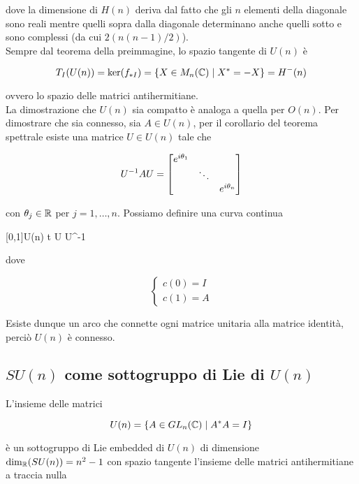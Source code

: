 dove la dimensione di $ H(n) $ deriva dal fatto che gli $ n $ elementi della diagonale sono reali mentre quelli sopra dalla diagonale determinano anche quelli sotto e sono complessi (da cui $ 2 (n(n-1)/2) $).\\
Sempre dal teorema della preimmagine, lo spazio tangente di $ U(n) $ è

\begin{equation}
	T_{I}(U(n)) = \ker(f_{*I}) = \{ X \in M_{n}(\mathbb{C}) \mid X^{*} = -X \} = H^{-}(n)
\end{equation}

ovvero lo spazio delle matrici antihermitiane.\\
La dimostrazione che $ U(n) $ sia compatto è analoga a quella per $ O(n) $. Per dimostrare che sia connesso, sia $ A \in U(n) $, per il corollario del teorema spettrale esiste una matrice $ U \in U(n) $ tale che

\begin{equation}
	U^{-1} A U = %
	\bmqty{ %
			\dmat{ %
					e^{i \theta_{1}}, %
					\ddots, %
					e^{i \theta_{n}} %
					} %
			}
\end{equation}

con $ \theta_{j} \in \mathbb{R} $ per $ j=1,\dots,n $. Possiamo definire una curva continua

	{[0,1]}{U(n)}
	{t}{ %
			U  U^{-1} %
			}

dove

\begin{equation}
	\begin{cases}
		c(0) = I\\
		c(1) = A
	\end{cases}
\end{equation}

Esiste dunque un arco che connette ogni matrice unitaria alla matrice identità, perciò $ U(n) $ è connesso.

\subsection{$ SU(n) $ come sottogruppo di Lie di $ U(n) $}

L'insieme delle matrici

\begin{equation}
	U(n) = \{ A \in GL_{n}(\mathbb{C}) \mid A^{*} A = I \}
\end{equation}

è un sottogruppo di Lie embedded di $ U(n) $ di dimensione $ \dim_{\mathbb{R}}(SU(n)) = n^{2} - 1 $ con spazio tangente l'insieme delle matrici antihermitiane a traccia nulla

